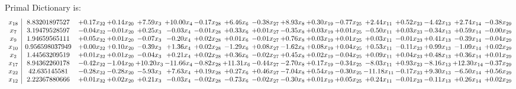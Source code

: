 \documentclass[9pt]{article}
\begin{document}
Primal Dictionary is:
\[\begin{array}{c| c c@{\hskip 2pt} c@{\hskip 2pt} c@{\hskip 2pt} c@{\hskip 2pt} c@{\hskip 2pt} c@{\hskip 2pt} c@{\hskip 2pt} c@{\hskip 2pt} c@{\hskip 2pt} c@{\hskip 2pt} c@{\hskip 2pt} c@{\hskip 2pt} c@{\hskip 2pt} c@{\hskip 2pt} c@{\hskip 2pt} }
 x_{18}   &  8.83201897527 & +  0.17 x_{32} & +  0.14 x_{20} & +  7.59 x_{3} & + 10.00 x_{4} & -0.17 x_{28} & +  6.46 x_{6} & -0.38 x_{27} & +  8.93 x_{8} & +  0.30 x_{19} & -0.77 x_{25} & +  2.44 x_{11} & +  0.52 x_{23} & -4.42 x_{13} & +  2.74 x_{14} & -0.38 x_{29}\\
 x_{7}   &  3.19479528597 & -0.04 x_{32} & -0.01 x_{20} & +  0.25 x_{3} & -0.03 x_{4} & -0.01 x_{28} & +  0.33 x_{6} & +  0.01 x_{27} & -0.35 x_{8} & +  0.03 x_{19} & +  0.01 x_{25} & -0.50 x_{11} & +  0.03 x_{23} & -0.34 x_{13} & +  0.59 x_{14} & -0.00 x_{29}\\
 x_{9}   &  1.94659565111 & +  0.05 x_{32} & +  0.01 x_{20} & -0.07 x_{3} & -0.20 x_{4} & +  0.02 x_{28} & +  0.01 x_{6} & -0.01 x_{27} & +  0.76 x_{8} & +  0.03 x_{19} & +  0.01 x_{25} & +  0.03 x_{11} & -0.01 x_{23} & +  0.41 x_{13} & -0.39 x_{14} & -0.04 x_{29}\\
 x_{10}   &  0.956598037949 & +  0.00 x_{32} & +  0.10 x_{20} & -0.39 x_{3} & +  1.36 x_{4} & +  0.02 x_{28} & -1.29 x_{6} & +  0.08 x_{27} & -1.62 x_{8} & +  0.08 x_{19} & +  0.04 x_{25} & +  0.53 x_{11} & -0.11 x_{23} & +  0.99 x_{13} & -1.09 x_{14} & +  0.02 x_{29}\\
 x_{2}   &  1.44563209519 & +  0.01 x_{32} & +  0.01 x_{20} & -0.04 x_{3} & +  0.21 x_{4} & +  0.02 x_{28} & +  0.36 x_{6} & -0.02 x_{27} & +  0.45 x_{8} & +  0.02 x_{19} & -0.04 x_{25} & +  0.09 x_{11} & +  0.04 x_{23} & +  0.48 x_{13} & +  0.36 x_{14} & +  0.01 x_{29}\\
 x_{17}   &  8.94362260178 & -0.42 x_{32} & -1.04 x_{20} & + 10.20 x_{3} & -11.66 x_{4} & -0.82 x_{28} & + 11.31 x_{6} & -0.44 x_{27} & -2.70 x_{8} & +  0.17 x_{19} & -0.34 x_{25} & -8.03 x_{11} & +  0.93 x_{23} & -8.16 x_{13} & + 12.30 x_{14} & -0.37 x_{29}\\
 x_{22}   &  42.635145581 & -0.28 x_{32} & -0.28 x_{20} & -5.93 x_{3} & +  7.63 x_{4} & +  0.19 x_{28} & +  0.27 x_{6} & +  0.46 x_{27} & -7.04 x_{8} & +  0.54 x_{19} & -0.30 x_{25} & -11.18 x_{11} & -0.17 x_{23} & +  9.30 x_{13} & -6.50 x_{14} & +  0.56 x_{29}\\
 x_{12}   &  2.22367880666 & +  0.01 x_{32} & +  0.02 x_{20} & +  0.21 x_{3} & -0.03 x_{4} & -0.02 x_{28} & -0.73 x_{6} & -0.02 x_{27} & -0.30 x_{8} & +  0.01 x_{19} & +  0.05 x_{25} & +  0.24 x_{11} & -0.01 x_{23} & -0.11 x_{13} & +  0.26 x_{14} & +  0.02 x_{29}\\

\end{array}\]
\end{document}
